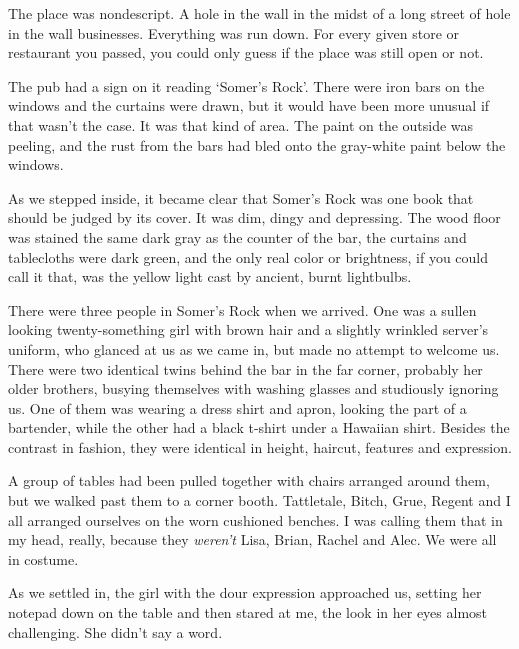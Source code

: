 





The place was nondescript.  A hole in the wall in the midst of a long street of hole in the wall businesses.  Everything was run down.  For every given store or restaurant you passed, you could only guess if the place was still open or not.



The pub had a sign on it reading `Somer's Rock'.  There were iron bars on the windows and the curtains were drawn, but it would have been more unusual if that wasn't the case.  It was that kind of area.  The paint on the outside was peeling, and the rust from the bars had bled onto the gray-white paint below the windows.



As we stepped inside, it became clear that Somer's Rock was one book that should be judged by its cover.  It was dim, dingy and depressing.  The wood floor was stained the same dark gray as the counter of the bar, the curtains and tablecloths were dark green, and the only real color or brightness, if you could call it that, was the yellow light cast by ancient, burnt lightbulbs.



There were three people in Somer's Rock when we arrived.  One was a sullen looking twenty-something girl with brown hair and a slightly wrinkled server's uniform, who glanced at us as we came in, but made no attempt to welcome us.  There were two identical twins behind the bar in the far corner, probably her older brothers, busying themselves with washing glasses and studiously ignoring us.  One of them was wearing a dress shirt and apron, looking the part of a bartender, while the other had a black t-shirt under a Hawaiian shirt.  Besides the contrast in fashion, they were identical in height, haircut, features and expression.



A group of tables had been pulled together with chairs arranged around them, but we walked past them to a corner booth.  Tattletale, Bitch, Grue, Regent and I all arranged ourselves on the worn cushioned benches.  I was calling them that in my head, really, because they \emph{weren't} Lisa, Brian, Rachel and Alec.  We were all in costume.



As we settled in, the girl with the dour expression approached us, setting her notepad down on the table and then stared at me, the look in her eyes almost challenging.  She didn't say a word.



